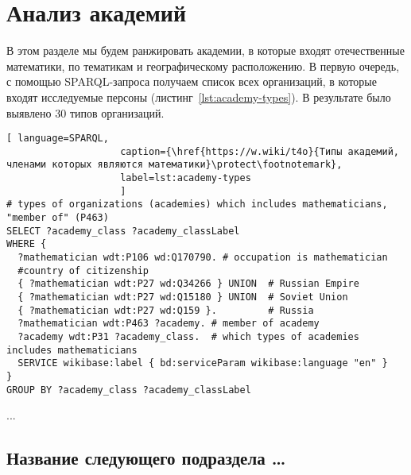 \chapter{Анализ академий}
\label{ch:academy-analysis}

В этом разделе мы будем ранжировать академии, 
в которые входят отечественные математики, 
по тематикам и географическому расположению. 
В первую очередь, с помощью SPARQL-запроса получаем  список всех организаций, 
в которые входят исследуемые персоны (листинг~\ref{lst:academy-types}). 
В результате было выявлено 30 типов организаций.

\begin{lstlisting}[ language=SPARQL, 
                    caption={\href{https://w.wiki/t4o}{Типы академий, членами которых являются математики}\protect\footnotemark},
                    label=lst:academy-types
                    ]
# types of organizations (academies) which includes mathematicians, "member of" (P463)
SELECT ?academy_class ?academy_classLabel
WHERE {
  ?mathematician wdt:P106 wd:Q170790. # occupation is mathematician
  #country of citizenship
  { ?mathematician wdt:P27 wd:Q34266 } UNION  # Russian Empire
  { ?mathematician wdt:P27 wd:Q15180 } UNION  # Soviet Union
  { ?mathematician wdt:P27 wd:Q159 }.         # Russia
  ?mathematician wdt:P463 ?academy. # member of academy
  ?academy wdt:P31 ?academy_class.  # which types of academies includes mathematicians
  SERVICE wikibase:label { bd:serviceParam wikibase:language "en" }
}
GROUP BY ?academy_class ?academy_classLabel
\end{lstlisting}


...

\section{Название следующего подраздела \ldots}




